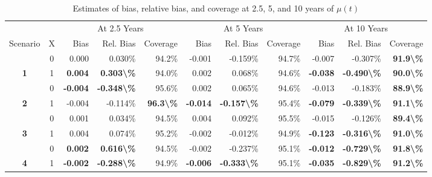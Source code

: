 \begin{table}

\caption{Estimates of bias, relative bias, and coverage at 2.5, 5, and 10 years of $\mu(t)$}
\centering
\begin{tabular}[t]{>{}ccrrrrrrrrr}
\toprule
\multicolumn{2}{c}{ } & \multicolumn{3}{c}{At 2.5 Years} & \multicolumn{3}{c}{At 5 Years} & \multicolumn{3}{c}{At 10 Years} \\
\cmidrule(l{3pt}r{3pt}){3-5} \cmidrule(l{3pt}r{3pt}){6-8} \cmidrule(l{3pt}r{3pt}){9-11}
Scenario & X & Bias & Rel. Bias & Coverage & Bias & Rel. Bias & Coverage & Bias & Rel. Bias & Coverage\\
\midrule
 & 0 & 0.000 & 0.030\% & 94.2\% & -0.001 & -0.159\% & 94.7\% & -0.007 & -0.307\% & \textbf{91.9\textbackslash{}\%}\\

\multirow[t]{-2}{*}{\centering\arraybackslash \textbf{1}} & 1 & \textbf{ 0.004} & \textbf{ 0.303\textbackslash{}\%} & 94.0\% & 0.002 & 0.068\% & 94.6\% & \textbf{-0.038} & \textbf{-0.490\textbackslash{}\%} & \textbf{90.0\textbackslash{}\%}\\

 & 0 & \textbf{-0.004} & \textbf{-0.348\textbackslash{}\%} & 95.6\% & 0.002 & 0.065\% & 94.6\% & -0.013 & -0.183\% & \textbf{88.9\textbackslash{}\%}\\

\multirow[t]{-2}{*}{\centering\arraybackslash \textbf{2}} & 1 & -0.004 & -0.114\% & \textbf{96.3\textbackslash{}\%} & \textbf{-0.014} & \textbf{-0.157\textbackslash{}\%} & 95.4\% & \textbf{-0.079} & \textbf{-0.339\textbackslash{}\%} & \textbf{91.1\textbackslash{}\%}\\

 & 0 & 0.001 & 0.034\% & 94.5\% & 0.004 & 0.092\% & 95.5\% & -0.015 & -0.126\% & \textbf{89.4\textbackslash{}\%}\\

\multirow[t]{-2}{*}{\centering\arraybackslash \textbf{3}} & 1 & 0.004 & 0.074\% & 95.2\% & -0.002 & -0.012\% & 94.9\% & \textbf{-0.123} & \textbf{-0.316\textbackslash{}\%} & \textbf{91.0\textbackslash{}\%}\\

\rule{0pt}{4ex}
 & 0 & \textbf{ 0.002} & \textbf{ 0.616\textbackslash{}\%} & 94.5\% & -0.002 & -0.237\% & 95.1\% & \textbf{-0.012} & \textbf{-0.729\textbackslash{}\%} & \textbf{91.8\textbackslash{}\%}\\

\multirow[t]{-2}{*}{\centering\arraybackslash \textbf{4}} & 1 & \textbf{-0.002} & \textbf{-0.288\textbackslash{}\%} & 94.9\% & \textbf{-0.006} & \textbf{-0.333\textbackslash{}\%} & 95.1\% & \textbf{-0.035} & \textbf{-0.829\textbackslash{}\%} & \textbf{91.2\textbackslash{}\%}\\


\end{tabular}
\end{table}

